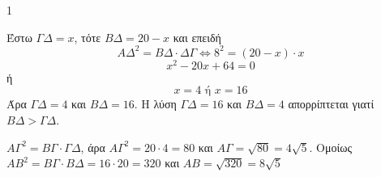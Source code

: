 \begin{ylh}{1}
    \item [Ύλη από εικόνα]
\end{ylh}
\begin{figure}
    \centering
\end{figure}
\begin{alist}
    \item Έστω $\Gamma\Delta=x$, τότε $B\Delta=20-x$ και επειδή
    \[ A\Delta^2 = B\Delta \cdot \Delta\Gamma \Leftrightarrow 8^2 = (20 - x) \cdot x \]
    \[ x^2 - 20x + 64 = 0 \]
    ή
    \[ x = 4 \text{ ή } x = 16 \]
    Άρα $\Gamma\Delta=4$ και $B\Delta=16$. Η λύση $\Gamma\Delta=16$ και $B\Delta=4$ απορρίπτεται γιατί $B\Delta > \Gamma\Delta$.

    \item $A\Gamma^2 = B\Gamma \cdot \Gamma\Delta$, άρα $A\Gamma^2 = 20 \cdot 4 = 80$
    και $A\Gamma = \sqrt{80} = 4\sqrt{5}.$
    Ομοίως $AB^2 = B\Gamma \cdot B\Delta = 16 \cdot 20 = 320$
    και $AB = \sqrt{320} = 8\sqrt{5}$
\end{alist}